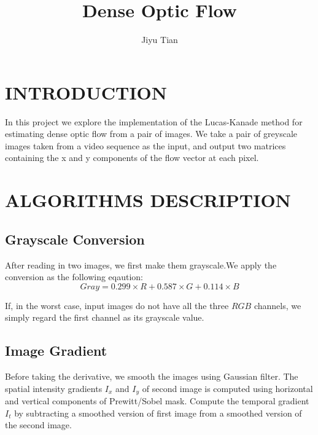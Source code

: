 \documentclass[letterpaper, 10 pt, conference]{ieeeconf}
\title{\Huge Dense Optic Flow}
\author{Jiyu Tian}
\begin{document}
\maketitle
\thispagestyle{empty}
\pagestyle{empty}


\section{INTRODUCTION}
In this project we explore the implementation of the Lucas-Kanade method for estimating dense optic flow from a pair of images. We take a pair of greyscale images taken from a video sequence as the input, and output two matrices containing the x and y components of the flow vector at each pixel.
\section{ALGORITHMS DESCRIPTION}
\subsection{Grayscale Conversion}
After reading in two images, we first make them grayscale.We apply the conversion as the following eqaution:
\begin{equation}
Gray = 0.299 \times R + 0.587 \times G + 0.114 \times B
\end{equation}

If, in the worst case, input images do not have all the three $RGB$ channels, we simply regard the first channel as its grayscale value.
\subsection{Image Gradient}
Before taking the derivative, we smooth the images using Gaussian filter. The spatial intensity gradients $I_x$ and $I_y$ of second image is computed using horizontal and vertical components of Prewitt/Sobel mask. Compute the temporal gradient $I_t$ by subtracting a smoothed version of first image from a smoothed version of the second image.
\end{document}
